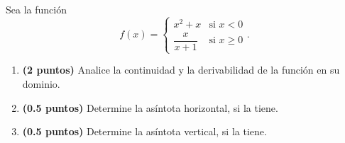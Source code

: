 
Sea la función
\[
f(x)=\begin{cases}x^2+x&\text{si }x<0\\[0.6em]\dfrac{x}{x+1}&\text{si }x\geq0\end{cases}.
\]
\begin{enumerate}[label=\alph*)]
\item \textbf{(2 puntos)} Analice la continuidad y la derivabilidad de la función en su dominio.
\item \textbf{(0.5 puntos)} Determine la asíntota horizontal, si la tiene.
\item \textbf{(0.5 puntos)} Determine la asíntota vertical, si la tiene.
\end{enumerate}
